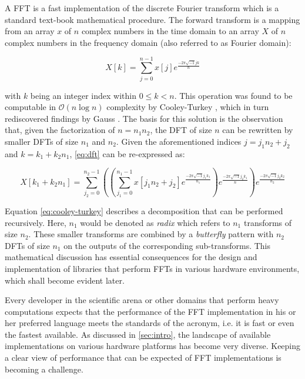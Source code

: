 A FFT is a fast implementation of the discrete Fourier transform which is a standard text-book mathematical procedure. The forward transform is a mapping from an array $x$ of $n$ complex numbers in the time domain to an array $X$ of $n$ complex numbers in the frequency domain (also referred to as Fourier domain):

\begin{equation}
  \label{eq:dft}
  X[k] = \sum_{j=0}^{n-1} x[j]e^{\frac{-2\pi\sqrt{-1}jk}{n}}
\end{equation}

with $k$ being an integer index within $0 \le k < n$. This operation was found to be computable in $\mathcal{O}(n \log n)$ complexity by Cooley-Turkey \cite{cooley1965algorithm}, which in turn rediscovered findings by Gauss \cite{gauss}. The basis for this solution is the observation that, given the factorization of $n=n_1n_2$, the  DFT of size $n$ can be rewritten by smaller DFTs of size $n_1$ and $n_2$.  Given the aforementioned indices $j=j_1n_2 + j_2$ and $k=k_1+k_2n_1$, \cref{eq:dft} can be re-expressed as:

\begin{equation}
  \label{eq:cooley-turkey}
  X[k_1 + k_2n_1] = \sum_{j_2=0}^{n_2-1} \left( \left( \sum_{j_1=0}^{n_1-1} x[j_1n_2 + j_2] e^{\frac{-2\pi\sqrt{-1}j_1k_1}{n_1}} \right) e^{\frac{-2\pi\sqrt{-1}j_2k_1}{n}} \right) e^{\frac{-2\pi\sqrt{-1}j_2k_2}{n_2}}
\end{equation}

Equation \cref{eq:cooley-turkey} describes a decomposition that can be performed recursively. Here, $n_1$ would be denoted as \emph{radix} which refers to $n_1$ transforms of size $n_2$. These smaller transforms are combined by a \emph{butterfly} pattern with $n_2$ DFTs of size $n_1$ on the outputs of the corresponding sub-transforms.
This mathematical discussion has essential consequences for the design and implementation of libraries that perform FFTs in various hardware environments, which shall become evident later.

Every developer in the scientific arena or other domains that perform heavy computations expects that the performance of the FFT implementation in his or her preferred language meets the standards of the acronym, i.e. it is fast or even the fastest available. As discussed in \cref{sec:intro}, the landscape of available implementations on various hardware platforms has become very diverse. Keeping a clear view of performance that can be expected of FFT implementations is becoming a challenge. 

